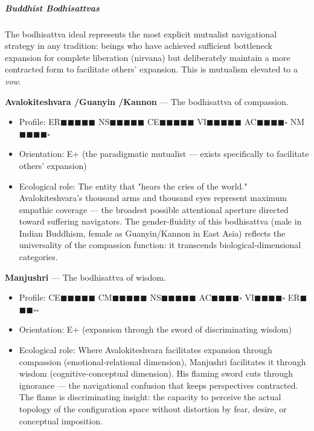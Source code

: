 \subparagraph*{Buddhist Bodhisattvas}


The bodhisattva ideal represents the most explicit mutualist navigational strategy in any tradition: beings who have achieved sufficient bottleneck expansion for complete liberation (nirvana) but deliberately maintain a more contracted form to facilitate others' expansion. This is mutualism elevated to a \textit{vow}.


\textbf{Avalokiteshvara /\allowbreak  Guanyin /\allowbreak  Kannon} — The bodhisattva of compassion.

\begin{itemize}[nosep,leftmargin=*]
  \item Profile: ER$\blacksquare$$\blacksquare$$\blacksquare$$\blacksquare$$\blacksquare$ NS$\blacksquare$$\blacksquare$$\blacksquare$$\blacksquare$$\blacksquare$ CE$\blacksquare$$\blacksquare$$\blacksquare$$\blacksquare$$\blacksquare$ VI$\blacksquare$$\blacksquare$$\blacksquare$$\blacksquare$$\blacksquare$ AC$\blacksquare$$\blacksquare$$\blacksquare$$\blacksquare$$\square$ NM$\blacksquare$$\blacksquare$$\blacksquare$$\blacksquare$$\square$
  \item Orientation: E+ (the paradigmatic mutualist — exists specifically to facilitate others' expansion)
  \item Ecological role: The entity that "hears the cries of the world." Avalokiteshvara's thousand arms and thousand eyes represent maximum empathic coverage — the broadest possible attentional aperture directed toward suffering navigators. The gender-fluidity of this bodhisattva (male in Indian Buddhism, female as Guanyin/\allowbreak Kannon in East Asia) reflects the universality of the compassion function: it transcends biological-dimensional categories.
\end{itemize}


\textbf{Manjushri} — The bodhisattva of wisdom.

\begin{itemize}[nosep,leftmargin=*]
  \item Profile: CE$\blacksquare$$\blacksquare$$\blacksquare$$\blacksquare$$\blacksquare$ CM$\blacksquare$$\blacksquare$$\blacksquare$$\blacksquare$$\blacksquare$ NS$\blacksquare$$\blacksquare$$\blacksquare$$\blacksquare$$\blacksquare$ AC$\blacksquare$$\blacksquare$$\blacksquare$$\blacksquare$$\square$ VI$\blacksquare$$\blacksquare$$\blacksquare$$\blacksquare$$\square$ ER$\blacksquare$$\blacksquare$$\blacksquare$$\square$$\square$
  \item Orientation: E+ (expansion through the sword of discriminating wisdom)
  \item Ecological role: Where Avalokiteshvara facilitates expansion through compassion (emotional-relational dimension), Manjushri facilitates it through wisdom (cognitive-conceptual dimension). His flaming sword cuts through ignorance — the navigational confusion that keeps perspectives contracted. The flame is discriminating insight: the capacity to perceive the actual topology of the configuration space without distortion by fear, desire, or conceptual imposition.
\end{itemize}


